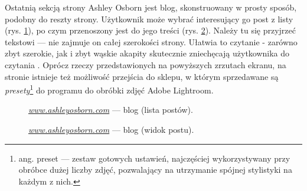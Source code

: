 \documentclass[12pt]{article}
\numberwithin{figure}{section}
\begin{document}
\begin{sloppypar}
Ostatnią sekcją strony Ashley Osborn jest blog, skonstruowany w prosty sposób, podobny do reszty strony. Użytkownik może wybrać interesujący go post z listy (rys. \ref{fig:ashley-4.jpg}), po czym przenoszony jest do jego treści (rys. \ref{fig:ashley-5.jpg}). Należy tu się przyjrzeć tekstowi --- nie zajmuje on całej szerokości strony. Ułatwia to czytanie - zarówno zbyt szerokie, jak i zbyt wąskie akapity skutecznie zniechęcają użytkownika do czytania \cite{szerokosc}. Oprócz rzeczy przedstawionych na powyższych zrzutach ekranu, na stronie istnieje też możliwość przejścia do sklepu, w którym sprzedawane są \textit{presety}\footnote{ang. preset --- zestaw gotowych ustawień, najczęściej wykorzystywany przy obróbce dużej liczby zdjęć, pozwalający na utrzymanie spójnej stylistyki na każdym z nich.} do programu do obróbki zdjęć Adobe Lightroom.

\begin{figure}[H] 
    \centering
   \caption{\textit{\url{www.ashleyosborn.com}} --- blog (lista postów).}
   \label{fig:ashley-4.jpg}
\end{figure}

\begin{figure}[H] 
    \centering
   \caption{\textit{\url{www.ashleyosborn.com}} --- blog (widok postu).}
   \label{fig:ashley-5.jpg}
\end{figure}



\end{sloppypar}
\end{document}
